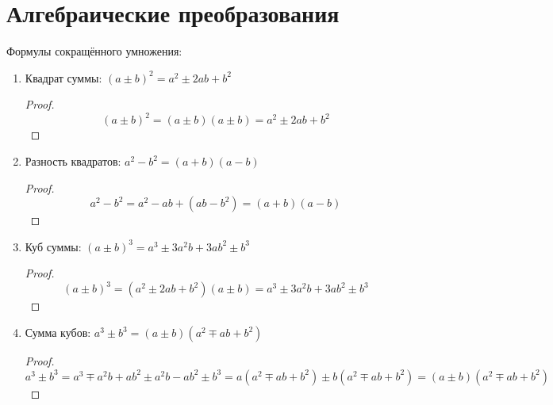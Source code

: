 \section{Алгебраические преобразования}
Формулы сокращённого умножения:
\begin{enumerate}
	\item Квадрат суммы: $(a \pm b)^2 = a^2 \pm 2ab + b^2$
	\begin{proof}
	\begin{equation*}
	(a \pm b)^2 = (a \pm b)(a \pm b) = a^2 \pm 2ab + b^2
	\end{equation*}
	\end{proof}
	
	\item Разность квадратов: $a^2 - b^2 = (a + b)(a - b)$
	\begin{proof}
	\begin{equation*}
	a^2 - b^2 = a^2 - ab + (ab - b^2) = (a + b)(a - b)
	\end{equation*}
	\end{proof}
	
	\item Куб суммы: $(a \pm b)^3 = a^3 \pm 3a^2 b + 3ab^2 \pm b^3$
	\begin{proof}
	\begin{equation*}
	(a \pm b)^3 = (a^2 \pm 2ab + b^2)(a \pm b) = a^3 \pm 3a^2 b + 3ab^2 \pm b^3
	\end{equation*}
	\end{proof}
	
	\item Сумма кубов: $a^3 \pm b^3 = (a \pm b)(a^2 \mp ab + b^2)$
	\begin{proof}
	\begin{equation*}
	a^3 \pm b^3 = a^3 \mp a^2 b + ab^2 \pm a^2 b - ab^2 \pm b^3 =
	a(a^2 \mp ab + b^2) \pm b(a^2 \mp ab + b^2) = (a \pm b)(a^2 \mp ab + b^2)
	\end{equation*}
	\end{proof}
\end{enumerate}

